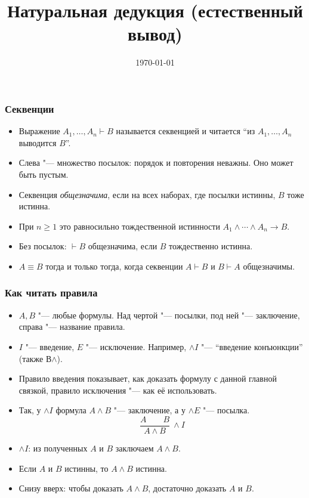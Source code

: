 \documentclass[10pt]{beamer}
\title{Натуральная дедукция (естественный вывод)}
\date{\today}
\begin{document}
\begin{frame}[plain]
    \maketitle
\end{frame}

\begin{frame}
    \frametitle{Секвенции}
    \begin{itemize}
        \item Выражение $A_1,\ldots,A_n \vdash B$ называется секвенцией и читается \enquote{из $A_1,\ldots,A_n$ выводится $B$}.
        \item Слева "--- множество посылок: порядок и повторения неважны. Оно может быть пустым. \pause
        \item Секвенция \emph{общезначима}, если на всех наборах, где посылки истинны, $B$ тоже истинна. \pause
        \item При $n\geqslant1$ это равносильно тождественной истинности $A_1\land\cdots\land A_n\to B$.
        \item Без посылок: $\vdash B$ общезначима, если $B$ тождественно истинна. \pause
        \item $A\equiv B$ тогда и только тогда, когда секвенции $A\vdash B$ и $B\vdash A$ общезначимы.
    \end{itemize}
\end{frame}

\begin{frame}
    \frametitle{Как читать правила}
    \begin{itemize}
        \item $A,B$ "--- любые формулы. Над чертой "--- посылки, под ней "--- заключение, справа "--- название правила.
        \item $I$ "--- введение, $E$ "--- исключение. Например, $\land I$ "--- \enquote{введение конъюнкции} (также В$\land$).
        \item Правило введения показывает, как доказать формулу с данной главной связкой, правило исключения "--- как её использовать.
        \item Так, у $\land I$ формула $A\land B$ "--- заключение, а у $\land E$ "--- посылка.
    \[
        \frac{A\qquad B}{A\land B}\ \land I
    \]
        \item<2-> $\land I$: из полученных $A$ и $B$ заключаем $A\land B$.
        \item<2-> Если $A$ и $B$ истинны, то $A\land B$ истинна.
        \item<3-> Снизу вверх: чтобы доказать $A\land B$, достаточно доказать $A$ и $B$.
    \end{itemize}
\end{frame}
\end{document}
